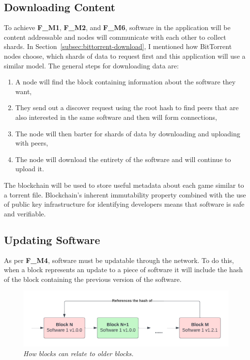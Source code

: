 \subsection*{Downloading Content}

To achieve \textbf{F\_M1}, \textbf{F\_M2}, and \textbf{F\_M6}, software in the application will be content addressable and nodes will communicate with each other to collect shards. In Section~\ref{subsec:bittorrent-download}, I mentioned how BitTorrent nodes choose, which shards of data to request first and this application will use a similar model. The general steps for downloading data are:

\begin{enumerate}
  \item A node will find the block containing information about the software they want,
  \item They send out a discover request using the root hash to find peers that are also interested in the same software and then will form connections,
  \item The node will then barter for shards of data by downloading and uploading with peers,
  \item The node will download the entirety of the software and will continue to upload it.
\end{enumerate}

\noindent The blockchain will be used to store useful metadata about each game similar to a \.torrent file. Blockchain's inherent immutability property combined with the use of public key infrastructure for identifying developers means that software is safe and verifiable. 

\subsection*{Updating Software}

As per \textbf{F\_M4}, software must be updatable through the network. To do this, when a block represents an update to a piece of software it will include the hash of the block containing the previous version of the software.

\begin{figure}[ht]
  \centering
  \includegraphics[width=.85\textwidth]{images/diagrams/update-software.png}
  \caption{\textit{How blocks can relate to older blocks.}}
\end{figure}

